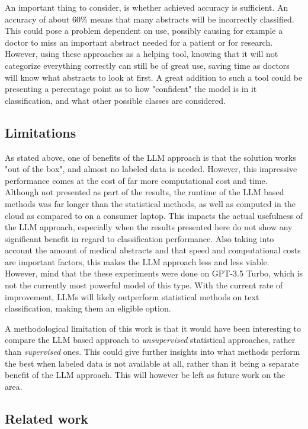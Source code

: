 An important thing to consider, is whether achieved accuracy is sufficient. An accuracy of about 60\% means that many abstracts will be incorrectly classified. This could pose a problem dependent on use, possibly causing for example a doctor to miss an important abstract needed for a patient or for research. However, using these approaches as a helping tool, knowing that it will not categorize everything correctly can still be of great use, saving time as doctors will know what abstracts to look at first. A great addition to such a tool could be presenting a percentage point as to how "confident" the model is in it classification, and what other possible classes are considered.

\subsection{Limitations}
\label{subsec:discussion-limitations}

As stated above, one of benefits of the LLM approach is that the solution works "out of the box", and almost no labeled data is needed. However, this impressive performance comes at the cost of far more computational cost and time. Although not presented as part of the results, the runtime of the LLM based methods was far longer than the statistical methods, as well as computed in the cloud as compared to on a consumer laptop. This impacts the actual usefulness of the LLM approach, especially when the results presented here do not show any significant benefit in regard to classification performance. Also taking into account the amount of medical abstracts and that speed and computational costs are important factors, this makes the LLM approach less and less viable. However, mind that the these experiments were done on GPT-3.5 Turbo, which is not the currently most powerful model of this type. With the current rate of improvement, LLMs will likely outperform statistical methods on text classification, making them an eligible option. 

A methodological limitation of this work is that it would have been interesting to compare the LLM based approach to \textit{unsupervised} statistical approaches, rather than \textit{supervised} ones. This could give further insights into what methods perform the best when labeled data is not available at all, rather than it being a separate benefit of the LLM approach. This will however be left as future work on the area.

\subsection{Related work}
\label{subsec:res-related-work}

